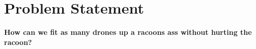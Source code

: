 \chapter{Problem Statement}

\textbf{How can we fit as many drones up a racoons ass without hurting the racoon?}